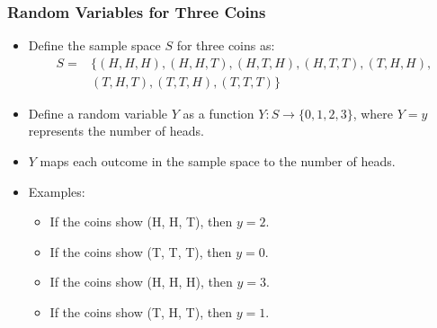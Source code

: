 \documentclass[handout]{beamer} %
\begin{document}
\begin{frame}
    \frametitle{Random Variables for Three Coins}
    \begin{itemize}
        \item Define the sample space \( S \) for three coins as: \pause
        \begin{align*}
        S =& \big\{ (H, H, H), (H, H, T), (H, T, H), (H, T, T), (T, H, H),  \\
        & (T, H, T), (T, T, H), (T, T, T) \big\}
        \end{align*}
        \vspace{-1.7em}
        \pause
        \item Define a random variable \( Y \) as a function \( Y: S \rightarrow \{0, 1, 2, 3\} \), where \( Y=y \) represents the number of heads. \pause
        \item \( Y \) maps each outcome in the sample space to the number of heads. \pause
        \item Examples: \pause
        \begin{itemize}
            \item If the coins show (H, H, T), then \( y = 2 \). \pause
            \item If the coins show (T, T, T), then \( y = 0 \). \pause
            \item If the coins show (H, H, H), then \( y = 3 \). \pause
            \item If the coins show (T, H, T), then \( y = 1 \).
        \end{itemize}
    \end{itemize}
\end{frame}
\end{document}
